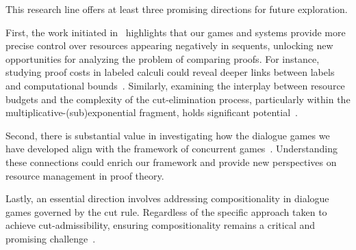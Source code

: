 
This research line offers at least three promising directions for future exploration.

First, the work initiated in~\cite{DBLP:conf/tableaux/LangOPF19} highlights that our games and systems provide more precise control over resources appearing negatively in sequents, unlocking new opportunities for analyzing the problem of comparing proofs. For instance, studying proof costs in labeled calculi could reveal deeper links between labels and computational bounds~\cite{DBLP:journals/jfp/AccattoliGK20}. Similarly, examining the interplay between resource budgets and the complexity of the cut-elimination process, particularly within the multiplicative-(sub)exponential fragment, holds significant potential~\cite{DBLP:journals/tcs/Strassburger03,DBLP:journals/tocl/StrassburgerG11}.

Second, there is substantial value in investigating how the dialogue games we have developed align with the framework of concurrent games~\cite{DBLP:conf/lics/AbramskyM99,DBLP:conf/lics/FaggianM05,DBLP:journals/lmcs/CastellanCRW17}. Understanding these connections could enrich our framework and provide new perspectives on resource management in proof theory.

Lastly, an essential direction involves addressing compositionality in dialogue games governed by the cut rule. Regardless of the specific approach taken to achieve cut-admissibility, ensuring compositionality remains a critical and promising challenge~\cite{dutilh18}.
